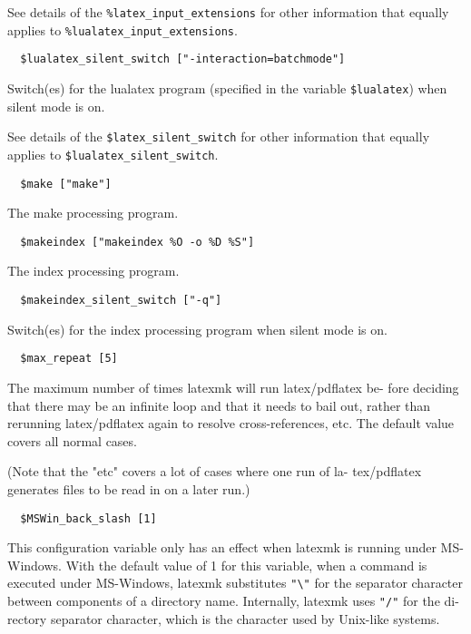 See details of the \verb|%latex_input_extensions| for other information
that equally applies to \verb|%lualatex_input_extensions|.

\begin{verbatim}
  $lualatex_silent_switch ["-interaction=batchmode"]
\end{verbatim}

Switch(es) for the lualatex program (specified in  the  variable
\verb|$lualatex|) when silent mode is on.

See  details  of  the \verb|$latex_silent_switch| for other information
that equally applies to \verb|$lualatex_silent_switch|.

\begin{verbatim}
  $make ["make"]
\end{verbatim}

The make processing program.

\begin{verbatim}
  $makeindex ["makeindex %O -o %D %S"]
\end{verbatim}

The index processing program.

\begin{verbatim}
  $makeindex_silent_switch ["-q"]
\end{verbatim}

Switch(es) for the index processing program when silent mode  is
on.

\begin{verbatim}
  $max_repeat [5]
\end{verbatim}

The  maximum number of times latexmk will run latex/pdflatex be-
fore deciding that there may be an infinite  loop  and  that  it
needs to bail out, rather than rerunning latex/pdflatex again to
resolve cross-references, etc.  The  default  value  covers  all
normal cases.

(Note  that the "etc" covers a lot of cases where one run of la-
tex/pdflatex generates files to be read in on a later run.)

\begin{verbatim}
  $MSWin_back_slash [1]
\end{verbatim}

This configuration variable only has an effect when  latexmk  is
running  under MS-Windows.  With the default value of 1 for this
variable, when a command is executed under  MS-Windows,  latexmk
substitutes  \verb|"\"|  for the separator character between components
of a directory name.  Internally, latexmk uses \verb|"/"| for  the  di-
rectory  separator  character,  which  is  the character used by
Unix-like systems.

